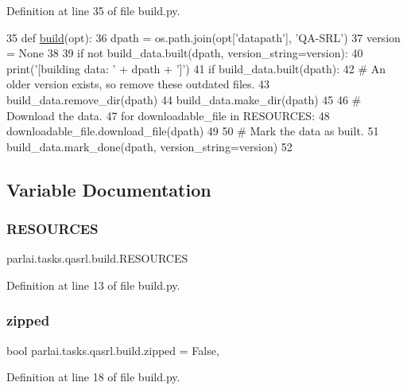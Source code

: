 Definition at line 35 of file build.\+py.


\begin{DoxyCode}
35 \textcolor{keyword}{def }\hyperlink{namespacedialog__babi__feedback_1_1build_a7a9d289f7493a5ded13c4b7f071b6184}{build}(opt):
36     dpath = os.path.join(opt[\textcolor{stringliteral}{'datapath'}], \textcolor{stringliteral}{'QA-SRL'})
37     version = \textcolor{keywordtype}{None}
38 
39     \textcolor{keywordflow}{if} \textcolor{keywordflow}{not} build\_data.built(dpath, version\_string=version):
40         print(\textcolor{stringliteral}{'[building data: '} + dpath + \textcolor{stringliteral}{']'})
41         \textcolor{keywordflow}{if} build\_data.built(dpath):
42             \textcolor{comment}{# An older version exists, so remove these outdated files.}
43             build\_data.remove\_dir(dpath)
44         build\_data.make\_dir(dpath)
45 
46         \textcolor{comment}{# Download the data.}
47         \textcolor{keywordflow}{for} downloadable\_file \textcolor{keywordflow}{in} RESOURCES:
48             downloadable\_file.download\_file(dpath)
49 
50         \textcolor{comment}{# Mark the data as built.}
51         build\_data.mark\_done(dpath, version\_string=version)
52 \end{DoxyCode}


\subsection{Variable Documentation}
\mbox{\label{namespaceparlai_1_1tasks_1_1qasrl_1_1build_a04e7b9e28ecdcb659118ff07cffbef7a}} 
\subsubsection{\texorpdfstring{R\+E\+S\+O\+U\+R\+C\+ES}{RESOURCES}}
{\footnotesize\ttfamily parlai.\+tasks.\+qasrl.\+build.\+R\+E\+S\+O\+U\+R\+C\+ES}



Definition at line 13 of file build.\+py.

\mbox{\label{namespaceparlai_1_1tasks_1_1qasrl_1_1build_a22ac6ac5d31f50f3b6415e3c0901cafe}} 
\subsubsection{\texorpdfstring{zipped}{zipped}}
{\footnotesize\ttfamily bool parlai.\+tasks.\+qasrl.\+build.\+zipped = False,}



Definition at line 18 of file build.\+py.

